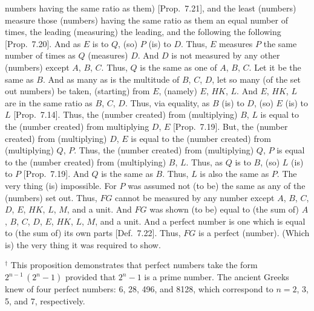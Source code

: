 \begin{Parallel}{}{}
{numbers having the same ratio as them) [Prop.~7.21],
and the least (numbers) measure those (numbers) having the same ratio as them an equal number of times, the leading (measuring) the leading, and the
following the following [Prop.~7.20].
And as $E$ is to $Q$, (so) $P$ (is) to $D$. Thus, $E$ measures $P$ the same number of times as $Q$ (measures) $D$. And $D$ is not measured by any
other (numbers) except $A$, $B$, $C$.  Thus, $Q$ is the same as one
of $A$, $B$, $C$. Let it be the same as $B$. And as many as is the
multitude of $B$, $C$, $D$, let so many (of the set out numbers) be taken, (starting) from $E$, 
(namely) $E$, $HK$, $L$. And $E$, $HK$, $L$ are in the same ratio as
$B$, $C$, $D$. Thus, via equality, as $B$ (is) to $D$, (so) $E$ (is) to $L$
[Prop.~7.14]. Thus, the (number created) from
(multiplying) $B$, $L$ is equal to the (number created) from multiplying
$D$, $E$ [Prop.~7.19]. But, the (number created)
from (multiplying) $D$, $E$ is equal to the (number created) from (multiplying)
$Q$, $P$. Thus, the (number created) from (multiplying) $Q$, $P$
is equal to the (number created) from (multiplying) $B$, $L$. Thus, as
$Q$ is to $B$, (so) $L$ (is) to $P$ [Prop.~7.19]. 
And $Q$ is the same as $B$. Thus, $L$ is also the same as $P$. The
very thing (is) impossible. For $P$ was assumed not (to be) the same
as any of the (numbers) set out. Thus, $FG$ cannot be measured by any number except $A$, $B$, $C$, $D$, $E$, $HK$, $L$, $M$, and a unit.
And $FG$ was shown (to be) equal to (the sum of) $A$, $B$, $C$, $D$, $E$, $HK$,
$L$, $M$, and a unit. And a perfect number is one which is equal to (the sum of) its own
parts [Def.~7.22]. Thus, $FG$ is a perfect (number).
(Which is) the very thing it was required to show.}
\end{Parallel}
{\footnotesize\noindent$^\dag$ This proposition demonstrates that perfect
numbers take the form $2^{n-1}\,(2^n-1)$ provided that $2^n-1$ is a prime
number. The ancient Greeks knew of four perfect numbers: 6, 28, 496, and
8128, which correspond to $n= 2$, 3, 5, and 7, respectively.}
